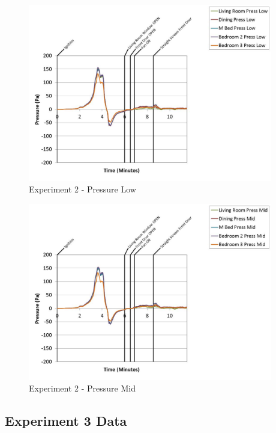 \documentclass{article}
\begin{document}
\begin{appendices}
	\clearpage

	\begin{figure}[h!]
		\centering
		\includegraphics[height=3.05in]{0_Images/Results_Charts/Exp_2_Charts/PressureLow.pdf}
		\caption{Experiment 2 - Pressure Low}
	\end{figure}
 

	\begin{figure}[h!]
		\centering
		\includegraphics[height=3.05in]{0_Images/Results_Charts/Exp_2_Charts/PressureMid.pdf}
		\caption{Experiment 2 - Pressure Mid}
	\end{figure}
 
	\clearpage

		\clearpage
\clearpage		\large
\subsection{Experiment 3 Data} \label{App:Exp3Results} 


\end{appendices}
\end{document}
